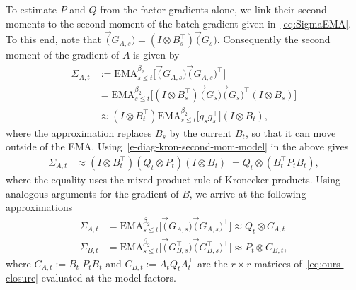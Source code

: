 To estimate $P$ and $Q$ from the factor gradients alone, we link their second moments to the second moment of the batch gradient given in~\eqref{eq:SigmaEMA}. 
To this end, note that
$\vec(G_{A,s})=(I\otimes B_s^\top)\vec(G_s)$. Consequently the second moment of the gradient of $A$ is given by
\begin{align*}
 \Sigma_{A,t} &:=  \mathrm{EMA}_{s \leq t}^{\beta_2}\big[ \vec(G_{A,s})  \vec(G_{A,s})^\top\big]  \\
 &=  \mathrm{EMA}_{s \leq t}^{\beta_2}\big[ (I\otimes B_s^\top)\vec(G_s)\vec(G_s)^\top   (I\otimes B_s)\big]  \\
   &\approx  (I\otimes B_t^\top) \mathrm{EMA}_{s \leq t}^{\beta_2}\big[ g_s g_s^\top   \big]  (I\otimes B_t),
\end{align*}
where the approximation replaces $B_s$ by the current $B_t$, so that it can move outside of the EMA.
 Using~\eqref{e-diag-kron-second-mom-model} in the above gives
\begin{align} \label{eq:SigmaAapprox}
 \Sigma_{A,t} 
   &\approx    (I\otimes B_t^\top)  (Q_t\otimes P_t)  (I\otimes B_t) \; =     Q_t\otimes  (B_t^\top P_t B_t),
\end{align} 
where the equality uses the mixed-product rule of Kronecker products.
Using analogous arguments for the gradient of $B$, we arrive at the following approximations
\begin{align}
  \Sigma_{A,t} & = \mathrm{EMA}_{s \leq t}^{\beta_2}\big[\vec(G_{A,s})\vec(G_{A,s})^\top\big] \approx Q_t\otimes C_{A,t} \nonumber \\
  \Sigma_{B,t}&=\mathrm{EMA}_{s \leq t}^{\beta_2}\big[\vec(G_{B,s}^\top)\vec(G_{B,s}^\top)^\top\big] \approx  P_t\otimes C_{B,t}, \label{eq:observable-moments}
\end{align}
where $C_{A,t}:=B_t^\top P_tB_t$ and $C_{B,t}:=A_tQ_tA_t^\top$ are the $r\times r$ matrices of~\eqref{eq:ours-closure} evaluated at the model factors.


